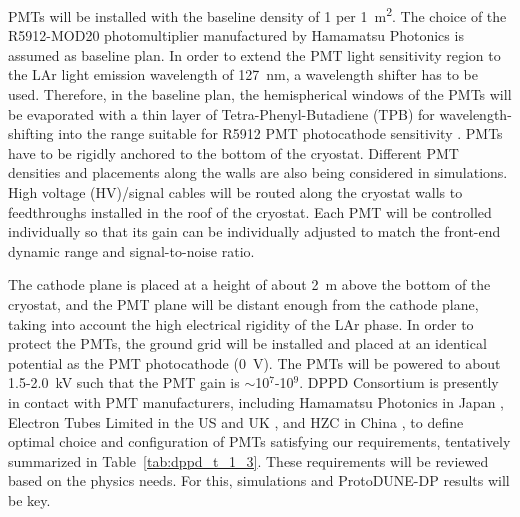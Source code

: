 PMTs will be installed with the baseline density of \num{1} per \SI{1}{m^2}. The choice of the R5912-MOD20 photomultiplier manufactured by Hamamatsu Photonics \cite{hamamatsu-5912} is assumed as baseline plan. In order to extend the PMT light sensitivity region to the LAr light emission wavelength of \SI{127}{nm}, a wavelength shifter has to be used. Therefore, in the baseline plan, the hemispherical windows of the PMTs will be evaporated with a thin layer of Tetra-Phenyl-Butadiene (TPB) \cite{tpb} for wavelength-shifting into the range suitable for R5912 PMT photocathode sensitivity \cite{hamamatsu-5912}. PMTs have to be rigidly anchored to the bottom of the cryostat. Different PMT densities and placements along the walls are also being considered in simulations. High voltage (HV)/signal cables will be routed along the cryostat walls to feedthroughs installed in the roof of the cryostat. Each PMT will be controlled individually so that its gain can be individually adjusted to match the front-end dynamic range and signal-to-noise ratio. 

The cathode plane is placed at a height of about \SI{2}{m} above the bottom of the cryostat, and the PMT plane will be distant enough from the cathode plane, taking into account the high electrical rigidity of the LAr phase. In order to protect the PMTs, the ground grid will be installed and placed at an identical potential as the PMT photocathode (\SI{0}{V}). The PMTs will be powered to about \num{1.5}-\SI{2.0}{kV} such that the PMT gain is $\sim$\num{10}$^7$-\num{10}$^9$. DPPD Consortium is presently in contact with PMT manufacturers, including Hamamatsu Photonics in Japan \cite{hamamatsu}, Electron Tubes Limited in the US and UK \cite{electrontubeslim}, and HZC in China \cite{hzc}, to define optimal choice and configuration of PMTs satisfying our requirements, tentatively summarized in Table~\ref{tab:dppd_t_1_3}. These requirements will be reviewed based on the physics needs. For this, simulations and ProtoDUNE-DP results will be key.

